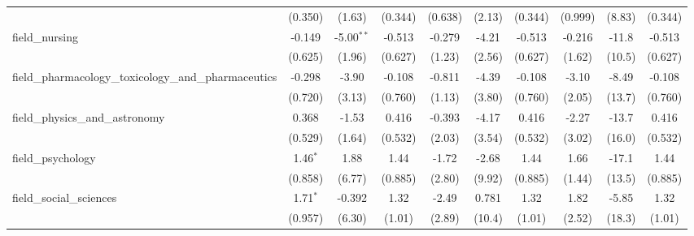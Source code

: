 \begin{tabular}{lccccccccc}
                                                               & (0.350)        & (1.63)         & (0.344)        & (0.638)        & (2.13)         & (0.344)        & (0.999)        & (8.83)         & (0.344)\\   
   field\_nursing                                              & -0.149         & -5.00$^{**}$   & -0.513         & -0.279         & -4.21          & -0.513         & -0.216         & -11.8          & -0.513\\   
                                                               & (0.625)        & (1.96)         & (0.627)        & (1.23)         & (2.56)         & (0.627)        & (1.62)         & (10.5)         & (0.627)\\   
   field\_pharmacology\_toxicology\_and\_pharmaceutics         & -0.298         & -3.90          & -0.108         & -0.811         & -4.39          & -0.108         & -3.10          & -8.49          & -0.108\\   
                                                               & (0.720)        & (3.13)         & (0.760)        & (1.13)         & (3.80)         & (0.760)        & (2.05)         & (13.7)         & (0.760)\\   
   field\_physics\_and\_astronomy                              & 0.368          & -1.53          & 0.416          & -0.393         & -4.17          & 0.416          & -2.27          & -13.7          & 0.416\\   
                                                               & (0.529)        & (1.64)         & (0.532)        & (2.03)         & (3.54)         & (0.532)        & (3.02)         & (16.0)         & (0.532)\\   
   field\_psychology                                           & 1.46$^{*}$     & 1.88           & 1.44           & -1.72          & -2.68          & 1.44           & 1.66           & -17.1          & 1.44\\   
                                                               & (0.858)        & (6.77)         & (0.885)        & (2.80)         & (9.92)         & (0.885)        & (1.44)         & (13.5)         & (0.885)\\   
   field\_social\_sciences                                     & 1.71$^{*}$     & -0.392         & 1.32           & -2.49          & 0.781          & 1.32           & 1.82           & -5.85          & 1.32\\   
                                                               & (0.957)        & (6.30)         & (1.01)         & (2.89)         & (10.4)         & (1.01)         & (2.52)         & (18.3)         & (1.01)\\   

\end{tabular}
